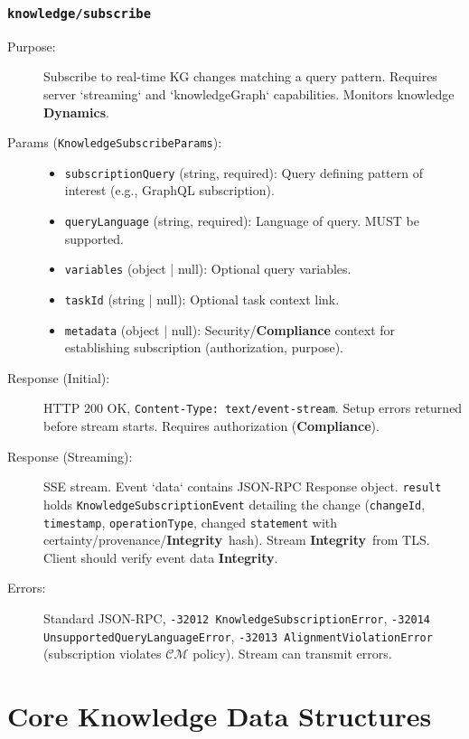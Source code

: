 \documentclass[12pt,a4paper]{report}
\newcommand{\Integrity}{\textbf{Integrity}}
\newcommand{\Dynamics}{\textbf{Dynamics}}
\begin{document}
	\subsubsection{\texttt{knowledge/subscribe}}
	\label{app:oami_kg_subscribe}
	\begin{description}
		\item[Purpose:] Subscribe to real-time KG changes matching a query pattern. Requires server `streaming` and `knowledgeGraph` capabilities. Monitors knowledge \Dynamics.
		\item[Params (\texttt{KnowledgeSubscribeParams}):]
		\begin{itemize} \itemsep0em
			\item \texttt{subscriptionQuery} (string, required): Query defining pattern of interest (e.g., GraphQL subscription).
			\item \texttt{queryLanguage} (string, required): Language of query. MUST be supported.
			\item \texttt{variables} (object | null): Optional query variables.
			\item \texttt{taskId} (string | null): Optional task context link.
			\item \texttt{metadata} (object | null): Security/\textbf{Compliance} context for establishing subscription (authorization, purpose).
		\end{itemize}
		\item[Response (Initial):] HTTP 200 OK, \texttt{Content-Type: text/event-stream}. Setup errors returned before stream starts. Requires authorization (\textbf{Compliance}).
		\item[Response (Streaming):] SSE stream. Event `data` contains JSON-RPC Response object. \texttt{result} holds \texttt{KnowledgeSubscriptionEvent} detailing the change (\texttt{changeId}, \texttt{timestamp}, \texttt{operationType}, changed \texttt{statement} with certainty/provenance/\Integrity\ hash). Stream \Integrity\ from TLS. Client should verify event data \Integrity.
		\item[Errors:] Standard JSON-RPC, \texttt{-32012 KnowledgeSubscriptionError}, \texttt{-32014 UnsupportedQueryLanguageError}, \texttt{-32013 AlignmentViolationError} (subscription violates $\mathcal{CM}$ policy). Stream can transmit errors.
	\end{description}
	
	\section{Core Knowledge Data Structures}
	\label{app:oami_kg_structures}
	
\end{document}
